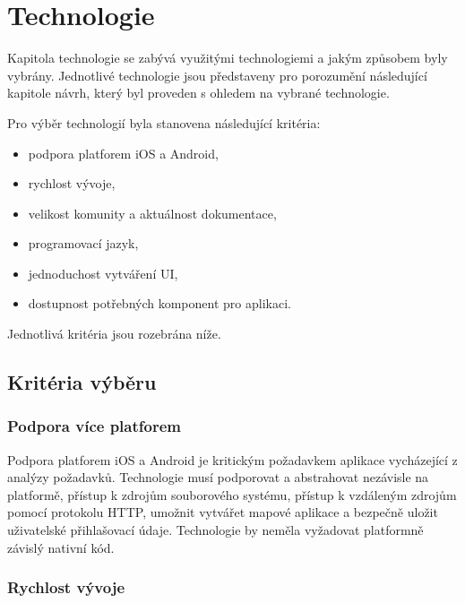 \chapter{Technologie}

Kapitola technologie se zabývá využitými technologiemi a jakým způsobem byly vybrány. Jednotlivé technologie jsou představeny pro porozumění následující kapitole návrh, který byl proveden s ohledem na vybrané technologie.

Pro výběr technologií byla stanovena následující kritéria:

\begin{itemize}
	\item podpora platforem iOS a Android,
	\item rychlost vývoje,
	\item velikost komunity a aktuálnost dokumentace,
	\item programovací jazyk,
	\item jednoduchost vytváření UI,
	\item dostupnost potřebných komponent pro aplikaci.
\end{itemize}

Jednotlivá kritéria jsou rozebrána níže.

\section{Kritéria výběru}

\subsection{Podpora více platforem}

Podpora platforem iOS a Android je kritickým požadavkem aplikace vycházející z analýzy požadavků. Technologie musí podporovat a abstrahovat nezávisle na platformě, přístup k zdrojům souborového systému, přístup k vzdáleným zdrojům pomocí protokolu HTTP, umožnit vytvářet mapové aplikace a bezpečně uložit uživatelské přihlašovací údaje. Technologie by neměla vyžadovat platformně závislý nativní kód.

\subsection{Rychlost vývoje}

